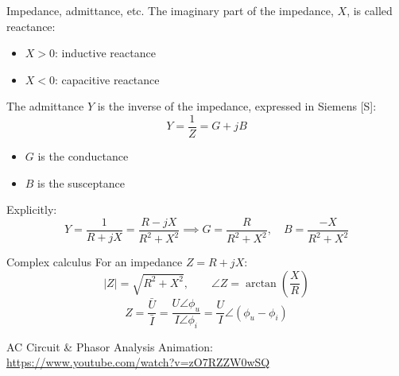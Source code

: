 \begin{frame}[allowframebreaks]{Impedance, admittance, etc.}
  The imaginary part of the impedance, $X$, is called \alert{reactance}:
  \begin{itemize}
    \item $X > 0$: inductive reactance
    \item $X < 0$: capacitive reactance
  \end{itemize}
  \vspace{0.2cm}
  The \alert{admittance} $Y$ is the inverse of the impedance, expressed in Siemens [S]:
  $$Y = \frac{1}{Z} = G + jB$$
  \begin{itemize}
    \item $G$ is the \alert{conductance}
    \item $B$ is the \alert{susceptance}
  \end{itemize}
  \vspace{0.2cm}
  Explicitly:
  $$Y = \frac{1}{R + jX} = \frac{R - jX}{R^2 + X^2} \implies G = \frac{R}{R^2 + X^2}, \quad B = \frac{-X}{R^2 + X^2}$$
\end{frame}

\begin{frame}{Complex calculus}
  For an impedance $Z = R + jX$:
  $$|Z| = \sqrt{R^2 + X^2}, \qquad \angle Z = \arctan \left(\frac{X}{R}\right)$$
  $$Z = \frac{\bar{U}}{\bar{I}} = \frac{U \angle \phi_u}{I \angle \phi_i} = \frac{U}{I} \angle (\phi_u - \phi_i)$$
  \vspace{0.3cm}
  \begin{tcolorbox}[colback=blue!5,colframe=blue!75,title=Animation]
    \centering
    AC Circuit \& Phasor Analysis Animation:\\
    \url{https://www.youtube.com/watch?v=zO7RZZW0wSQ}
  \end{tcolorbox}
\end{frame}

